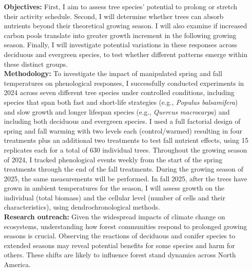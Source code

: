 \documentclass[12pt]{article}
\begin{document}
\textbf {Objectives:} First, I aim to assess tree species' potential to prolong or stretch their activity schedule. Second, I will determine whether trees can absorb nutrients beyond their theoretical growing season. I will also examine if increased carbon pools translate into greater growth increment in the following growing season. Finally, I will investigate potential variations in these responses across deciduous and evergreen species, to test whether different patterns emerge within these distinct groups.\\ %
\textbf {Methodology:} To investigate the impact of manipulated spring and fall temperatures on phenological responses, I successfully conducted experiments in 2024 across seven different tree species under controlled conditions, including species that span both fast and short-life strategies (e.g., \emph{Populus balsamifera}) and slow growth and longer lifespan species (e.g., \emph{Quercus macrocarpa}) and including both deciduous and evergreen species.\citep{jonsson_annual_2010} I used a full factorial design of spring and fall warming with two levels each (control/warmed) resulting in four treatments plus an additional two treatments to test fall nutrient effects, using 15 replicates each for a total of 630 individual trees. %
Throughout the growing season of 2024, I tracked phenological events weekly from the start of the spring treatments through the end of the fall treatments. During the growing season of 2025, the same measurements will be performed. In fall 2025, after the trees have grown in ambient temperatures for the season, I will assess growth on the individual (total biomass) and the cellular level (number of cells and their characteristics), using dendrochronological methods.\\
\textbf{Research outreach:} Given the widespread impacts of climate change on ecosystems, understanding how forest communities respond to prolonged growing seasons is crucial. Observing the reactions of deciduous and conifer species to extended seasons may reveal potential benefits for some species and harm for others. These shifts are likely to influence forest stand dynamics across North America.


\end{document}
